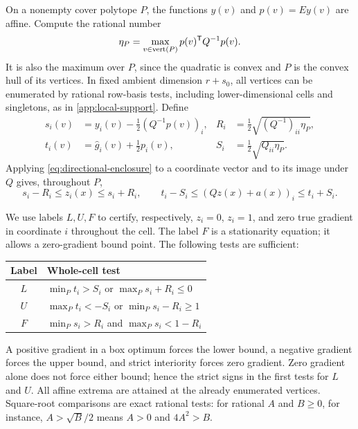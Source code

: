On a nonempty cover polytope $P$, the functions $y(v)$ and $p(v)=Ey(v)$
are affine. Compute the rational number
\begin{equation}\label{eq:screening-eta}
       \eta_P=\max_{v\in\operatorname{vert}(P)}p(v)^{\mathsf T} Q^{-1}p(v).
\end{equation}
It is also the maximum over $P$, since the quadratic is convex and
$P$ is the convex hull of its vertices. In fixed ambient dimension
$r+s_0$, all vertices can be enumerated by rational row-basis tests,
including lower-dimensional cells and singletons, as in
\cref{app:local-support}. Define
\begin{align}
 s_i(v)&=y_i(v)-\tfrac12(Q^{-1}p(v))_i,&
 R_i&=\tfrac12\sqrt{(Q^{-1})_{ii}\eta_P},
 \label{eq:screening-centers}\\
 t_i(v)&=\widehat g_i(v)+\tfrac12p_i(v),&
 S_i&=\tfrac12\sqrt{Q_{ii}\eta_P}.
 \nonumber
\end{align}
Applying \eqref{eq:directional-enclosure} to a coordinate vector
and to its image under $Q$ gives, throughout $P$,
\begin{equation}\label{eq:screening-coordinate-gradient}
 s_i-R_i\le z_i(x)\le s_i+R_i,\qquad
 t_i-S_i\le (Qz(x)+a(x))_i\le t_i+S_i.
\end{equation}

We use labels $L,U,F$ to certify, respectively, $z_i=0$, $z_i=1$,
and zero true gradient in coordinate $i$ throughout the cell. The label
$F$ is a stationarity equation; it allows a zero-gradient bound point.
The following tests are sufficient:
\begin{center}
\begin{tabular}{cl}
\toprule
Label & Whole-cell test\\
\midrule
$L$ & $\min_P t_i>S_i$ or $\max_P s_i+R_i\le0$\\
$U$ & $\max_P t_i<-S_i$ or $\min_P s_i-R_i\ge1$\\
$F$ & $\min_P s_i>R_i$ and $\max_P s_i<1-R_i$\\
\bottomrule
\end{tabular}
\end{center}
A positive gradient in a box optimum forces the lower bound, a negative
gradient forces the upper bound, and strict interiority forces zero
gradient. Zero gradient alone does not force either bound; hence the
strict signs in the first tests for $L$ and $U$. All affine extrema
are attained at the already enumerated vertices. Square-root comparisons
are exact rational tests: for rational $A$ and $B\ge0$, for instance,
$A>\sqrt B/2$ means $A>0$ and $4A^2>B$.

